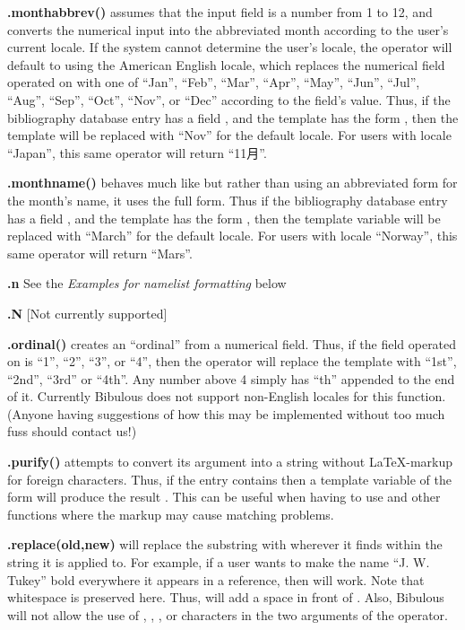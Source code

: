 \documentclass[letterpaper,10pt,english]{sphinxmanual}
\begin{document}
\textbf{.monthabbrev()} assumes that the input field is a number from 1 to 12, and converts the numerical input into the abbreviated month according to the user's current locale. If the system cannot determine the user's locale, the operator will default to using the American English locale, which replaces the numerical field operated on with one of ``Jan'', ``Feb'', ``Mar'', ``Apr'', ``May'', ``Jun'', ``Jul'', ``Aug'', ``Sep'', ``Oct'', ``Nov'', or ``Dec'' according to the field's value. Thus, if the bibliography database entry has a field , and the template has the form , then the template will be replaced with ``Nov'' for the default locale. For users with locale ``Japan'', this same operator will return ``11月''.

\textbf{.monthname()} behaves much like  but rather than using an abbreviated form for the month's name, it uses the full form. Thus if the bibliography database entry has a field , and the template has the form , then the template variable will be replaced with ``March'' for the default locale. For users with locale ``Norway'', this same operator will return ``Mars''.

\textbf{.n} See the \emph{Examples for namelist formatting} below

\textbf{.N} {[}Not currently supported{]}

\textbf{.ordinal()} creates an ``ordinal'' from a numerical field. Thus, if the field operated on is ``1'', ``2'', ``3'', or ``4'', then the operator will replace the template with ``1st'', ``2nd'', ``3rd'' or ``4th''. Any number above 4 simply has ``th'' appended to the end of it. Currently Bibulous does not support non-English locales for this function. (Anyone having suggestions of how this may be implemented without too much fuss should contact us!)

\textbf{.purify()} attempts to convert its argument into a string without LaTeX-markup for foreign characters. Thus, if the entry contains  then a template variable of the form  will produce the result . This can be useful when having to use  and other functions where the markup may cause matching problems.

\textbf{.replace(old,new)} will replace the substring  with  wherever it finds  within the string it is applied to. For example, if a user wants to make the name ``J. W. Tukey'' bold everywhere it appears in a reference, then  will work. Note that whitespace is preserved here. Thus,  will add a space in front of . Also, Bibulous will not allow the use of \code{\textless{}}, \code{\textgreater{}}, \code{\textbar{}}, or \code{)} characters in the two arguments of the operator.
\end{document}
